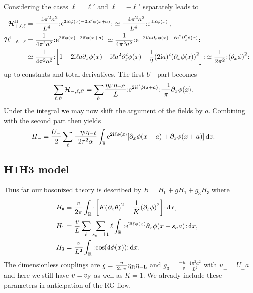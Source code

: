 \documentclass[english, parskip=full]{scrartcl}
\begin{document}
Considering the cases $\ell=\ell'$ and $\ell=-\ell'$ separately leads to
\begin{align}
\mathcal{H}_{+,\ell,\ell}^\Text{II} &= \frac{-4\pi^2a^2}{L^4} \normord{\powe{2\i\ell\phi(x) + 2\i\ell'\phi(x+a)}} \simeq \frac{-4\pi^2a^2}{L^4} \normord{\powe{4\i\ell\phi(x)}},\\
\mathcal{H}_{+,\ell,-\ell}^\Text{II} &= \frac{1}{4\pi^2a^2} \normord{\powe{2\i\ell\phi(x) - 2\i\ell\phi(x+a)}} \simeq \frac{1}{4\pi^2a^2} \normord{\powe{-2\i\ell a\partial_x\phi(x) - \i\ell a^2\partial_x^2\phi(x)}}\\
&\simeq \frac{1}{4\pi^2a^2} \normord{\klb*{1 - 2\i\ell a\partial_x\phi(x) - \i\ell a^2\partial_x^2\phi(x) - \frac{1}{2} (2\i a)^2\kla*{\partial_x\phi(x)}^2 }} \simeq \frac{1}{2\pi^2} \normord{\kla*{\partial_x\phi}^2}
\end{align}
up to constants and total derivatives.
The first $U_-$-part becomes
\begin{align}
\sum_{\ell,\ell'} \mathcal{H}_{-,\ell,\ell'} &= \sum_{\ell'} \frac{\eta_{\ell'} \eta_{-\ell'}}{L} {:\mathrel{\mspace{1mu}\text{e}^{2\text{i}\ell'\phi(x+a)}\mspace{1mu}}:}\frac{-1}{\pi} \partial_x\phi(x).
\end{align}
Under the integral we may now shift the argument of the fields by $a$.
Combining with the second part then yields
\begin{align}
H_- &= \frac{U_-}{2} \sum_\ell \frac{ -\eta_\ell \eta_{-\ell}}{2\pi^2\alpha} \intr{  \powe{2\i\ell\phi(x)} \klb*{\partial_x\phi(x-a) + \partial_x\phi(x+a)} }{x}.
\end{align}
\subsection{H1H3 model}
Thus far our bosonized theory is described by $H=H_0 + gH_1 + g_3H_3$ where
\begin{align}
H_0 &= \frac{v}{2\pi} \intr{\normord{\klb*{K \kla*{\partial_x\theta}^2 + \frac{1}{K} \kla*{\partial_x\phi}^2}}}{x},\\
H_1 &= \frac{v}{L} \sum_\ell \sum_{s_a=\pm 1} \ell \intr{\normord{\powe{2\i\ell\phi(x)} \partial_x\phi(x+s_aa)}}{x},\\
H_3 &= \frac{v}{L^2} \intr{\normord{\cos\kla*{4\phi(x)}}}{x}.
\end{align}
The dimensionless couplings are $g = \frac{-u_-}{2\pi v} \eta_{\text{R}} \eta_{-\text{L}}$ and $g_3=\frac{-u_+}{v}\frac{4\pi^2a^2}{L^2}$ with $u_\pm=U_\pm a$ and here we still have $v=v_{\text{F}}$ as well as $K=1$.
We already include these parameters in anticipation of the RG flow.
\end{document}
